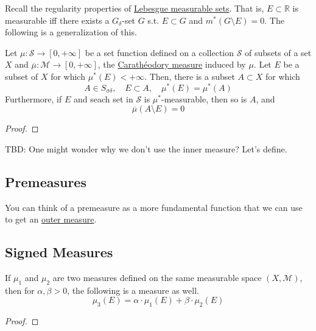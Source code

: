   Recall the regularity properties of \hyperref[def:lebesgue-measurable-set]{Lebesgue measurable sets}. That is, $E \subset \mathbb{R}$ is measurable iff there exists a $G_\delta$-set $G$ s.t. $E \subset G$ and $m^\ast (G \setminus E) = 0$. The following is a generalization of this. 

  \begin{theorem}
    \label{thm:regularity-of-muast-measurable-sets}
    Let $\mu: \mathcal{S} \to [0, +\infty]$ be a set function defined on a collection $\mathcal{S}$ of subsets of a set $X$ and $\overline{\mu}: \mathcal{M} \to [0, +\infty]$, the \hyperref[def:caratheodory-measure]{Carathéodory measure} induced by $\mu$. Let $E$ be a subset of $X$ for which $\mu^\ast (E) < +\infty$. Then, there is a subset $A \subset X$ for which 
    \begin{equation}
      A \in S_{\sigma \delta}, \quad E \subset A, \quad \mu^\ast (E) = \mu^\ast (A)
    \end{equation}
    Furthermore, if $E$ and seach set in $\mathcal{S}$ is $\mu^\ast$-measurable, then so is $A$, and 
    \begin{equation}
      \overline{\mu}(A \setminus E) = 0
    \end{equation}
  \end{theorem}
  \begin{proof}

  \end{proof}


	TBD: One might wonder why we don't use the inner measure? Let's define. 

\subsection{Premeasures}

	You can think of a premeasure as a more fundamental function that we can use to get an \hyperref[def:outer-measure]{outer measure}. 

\subsection{Signed Measures}

  \begin{lemma}
    \label{thm:sums-and-positive-multiples-of-measures-are}
    If $\mu_1$ and $\mu_2$ are two measures defined on the same measurable space $(X, \mathcal{M})$, then for $\alpha, \beta > 0$, the following is a measure as well. 
    \begin{equation}
      \mu_3 (E) = \alpha \cdot \mu_1 (E) + \beta \cdot \mu_2 (E)
    \end{equation}
  \end{lemma}
  \begin{proof}
    
  \end{proof}

